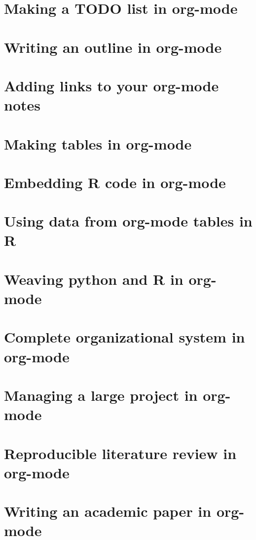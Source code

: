 \documentclass{article}
\begin{document}
\section{Making a TODO list in org-mode}
\label{sec-15}
\section{Writing an outline in org-mode}
\label{sec-16}
\section{Adding links to your org-mode notes}
\label{sec-17}
\section{Making tables in org-mode}
\label{sec-18}
\section{Embedding R code in org-mode}
\label{sec-19}
\section{Using data from org-mode tables in R}
\label{sec-20}
\section{Weaving python and R in org-mode}
\label{sec-21}
\section{Complete organizational system in org-mode}
\label{sec-22}
\section{Managing a large project in org-mode}
\label{sec-23}
\section{Reproducible literature review in org-mode}
\label{sec-24}
\section{Writing an academic paper in org-mode}
\label{sec-25}
\end{document}
